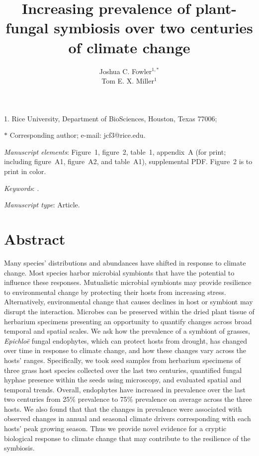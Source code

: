 \documentclass[11pt]{article}
\title{Increasing prevalence of plant-fungal symbiosis over two centuries of climate change}
\author{Joshua C. Fowler$^{1,\ast}$ \\
	Tom E. X. Miller$^{1}$}
\date{}
\begin{document}
	
	\maketitle
	
	\noindent{} 1. Rice University, Department of BioSciences, Houston, Texas 77006;


	\noindent{} $\ast$ Corresponding author; e-mail: jcf3@rice.edu.
	
	\bigskip
	
	\textit{Manuscript elements}: Figure~1, figure~2, table~1, appendix~A (for print; including figure~A1, figure~A2, and table~A1), supplemental PDF. Figure~2 is to print in color.
	
	\bigskip
	
	\textit{Keywords}: .
	
	\bigskip
	
	\textit{Manuscript type}: Article. %
	
	\bigskip
	
	
	
	\newpage{}
	
	\section*{Abstract}
Many species' distributions and abundances have shifted in response to climate change. 
Most species harbor microbial symbionts that have the potential to influence these responses.
Mutualistic microbial symbionts may provide resilience to environmental change by protecting their hosts from increasing stress. Alternatively, environmental change that causes declines in host or symbiont may disrupt the interaction. 
Microbes can be preserved within the dried plant tissue of herbarium specimens presenting an opportunity to quantify changes across broad temporal and spatial scales. 
We ask how the prevalence of a symbiont of grasses, \emph{Epichloë} fungal endophytes, which can protect hosts from drought, has changed over time in response to climate change, and how these changes vary across the hosts' ranges.
Specifically, we took seed samples from herbarium specimens of three grass host species collected over the last two centuries, quantified fungal hyphae presence within the seeds using microscopy, and evaluated spatial and temporal trends. 
Overall, endophytes have increased in prevalence over the last two centuries from 25\% prevalence to 75\% prevalence on average across the three hosts.
We also found that that the changes in prevalence were associated with observed changes in annual and seasonal climate drivers corresponding with each hosts' peak growing season. 
Thus we provide novel evidence for a cryptic biological response to climate change that may contribute to the resilience of the symbiosis.
	
\end{document}
